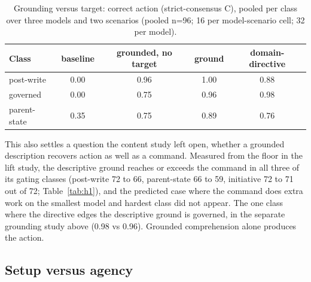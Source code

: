 \documentclass[11pt,a4paper]{article}
\begin{document}
\begin{table}[h]
\centering
\small
\caption{Grounding versus target: correct action (strict-consensus C), pooled per class
  over three models and two scenarios (pooled n=96; 16 per model-scenario cell; 32 per
  model).}
\label{tab:ground}
\begin{tabular}{@{}lcccc@{}}
\toprule
Class & baseline & grounded, no target & ground & domain-directive \\
\midrule
post-write & 0.00 & 0.96 & 1.00 & 0.88 \\
governed   & 0.00 & 0.75 & 0.96 & 0.98 \\
parent-state & 0.35 & 0.75 & 0.89 & 0.76 \\
\bottomrule
\end{tabular}
\end{table}

This also settles a question the content study left open, whether a grounded
description recovers action as well as a command. Measured from the floor in the lift
study, the descriptive ground reaches or exceeds the command in all three of its gating
classes (post-write 72 to 66, parent-state 66 to 59, initiative 72 to 71 out of 72;
Table~\ref{tab:h1}), and the predicted case where the command does extra work on the
smallest model and hardest class did not appear. The one class where the directive edges
the descriptive ground is governed, in the separate grounding study above (0.98 vs 0.96).
Grounded comprehension alone produces the action.

\subsection{Setup versus agency}\label{sec:setup}
\end{document}
